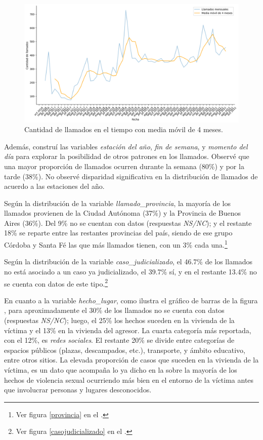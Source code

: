 \documentclass[10 pt]{article}
\begin{document}
\begin{figure}[H]
    \begin{center}
    \includegraphics[scale=.5]{images/latex_trend_llamados.png}
    \caption{Cantidad de llamados en el tiempo con media móvil de 4 meses.}
    \label{trend}
    \end{center}
    \end{figure}

Además, construí las variables \textit{estación del año}, \textit{fin de semana}, y \textit{momento del día} para explorar la posibilidad de otros patrones en los llamados. Observé que una mayor proporción de llamados ocurren durante la semana (80\%) y por la tarde (38\%). No observé disparidad significativa en la distribución de llamados de acuerdo a las estaciones del año.


Según la distribución de la variable \textit{llamado\_provincia}, la mayoría de los llamados provienen de la Ciudad Autónoma (37\%) y la Provincia de Buenos Aires (36\%). Del 9\% no se cuentan con datos (respuestas \textit{NS/NC}); y el restante 18\% se reparte entre las restantes provincias del país, siendo de ese grupo Córdoba y Santa Fé las que más llamados tienen, con un 3\% cada una.\footnote{Ver figura \ref{provincia} en el .}

Según la distribución de la variable \textit{caso\_judicializado}, el 46.7\% de los llamados no está asociado a un caso ya judicializado, el 39.7\% sí, y en el restante 13.4\% no se cuenta con datos de este tipo.\footnote{Ver figura \ref{casojudicializado} en el .} 

En cuanto a la variable \textit{hecho\_lugar}, como ilustra el gráfico de barras de la figura , para aproximadamente el 30\% de los llamados no se cuenta con datos (respuestas \textit{NS/NC}); luego, el 25\% los hechos suceden en la vivienda de la víctima y el 13\% en la vivienda del agresor. La cuarta categoría más reportada, con el 12\%, es \textit{redes sociales}. El restante 20\% se divide entre categorías de espacios públicos (plazas, descampados, etc.), transporte, y ámbito educativo, entre otros sitios. La elevada proporción de casos que suceden en la vivienda de la víctima, es un dato que acompaña lo ya dicho en la  sobre la mayoría de los hechos de violencia sexual ocurriendo más bien en el entorno de la víctima antes que involucrar personas y lugares desconocidos. 
\end{document}
